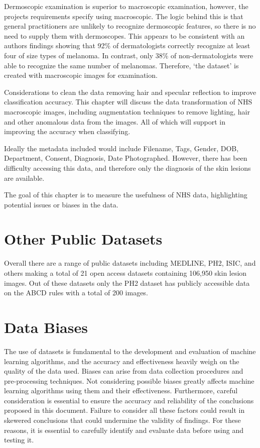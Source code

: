 Dermoscopic examination is superior to macroscopic examination, however, the projects requirements specify using macroscopic. The logic behind this is that general practitioners are unlikely to recognize dermoscopic features, so there is no need to supply them with dermoscopes.  This appears to be consistent with an authors findings showing that 92\% of dermatologists correctly recognize at least four of size types of melanoma. In contrast, only 38\% of non-dermatologists were able to recognize the same number of melanomas\cite{Tae2019}. Therefore, `the dataset' is created with macroscopic images for examination.

Considerations to clean the data removing hair and specular reflection to improve classification accuracy. This chapter will discuss the data transformation of NHS macroscopic images, including augmentation techniques to remove lighting, hair and other anomalous data from the images. All of which will support in improving the accuracy when classifying.

Ideally the metadata included would include Filename, Tags, Gender, DOB, Department, Consent, Diagnosis, Date Photographed. However, there has been difficulty accessing this data, and therefore only the diagnosis of the skin lesions are available.

The goal of this chapter is to measure the usefulness of NHS data, highlighting potential issues or biases in the data.

\section{Other Public Datasets}
Overall there are a range of public datasets including MEDLINE, PH2, ISIC, and others making a total of 21 open access datasets containing 106,950 skin lesion images\cite{Wen2022}. Out of these datasets only the PH2 dataset has publicly accessible data on the ABCD rules with a total of 200 images.


\section{Data Biases}
The use of datasets is fundamental to the development and evaluation of machine learning algorithms, and the accuracy and effectiveness heavily weigh on the quality of the data used. Biases can arise from data collection procedures and pre-processing techniques. Not considering possible biases greatly affects machine learning algorithms using them and their effectiveness. Furthermore, careful consideration is essential to ensure the accuracy and reliability of the conclusions proposed in this document. Failure to consider all these factors could result in skewered conclusions that could undermine the validity of findings. For these reasons, it is essential to carefully identify and evaluate data before using and testing it.

